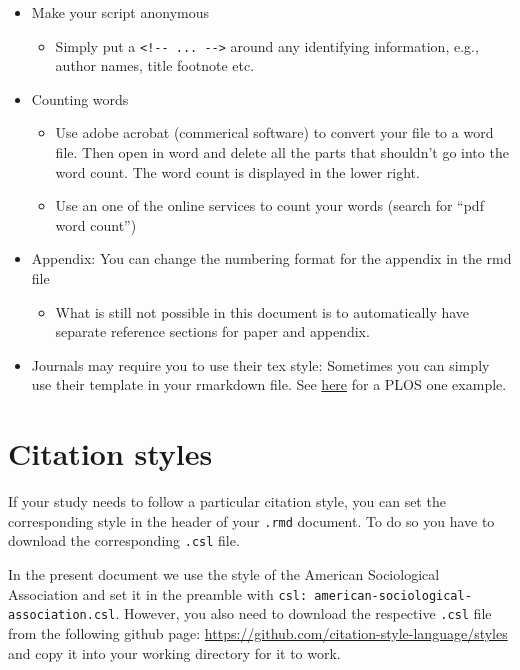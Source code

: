 \documentclass[
  12pt,
]{article}
\providecommand{\tightlist}{%
  \setlength{\itemsep}{0pt}\setlength{\parskip}{0pt}}
\begin{document}
\begin{itemize}
\tightlist
\item
  Make your script anonymous

  \begin{itemize}
  \tightlist
  \item
    Simply put a \texttt{\textless{}!-\/-\ ...\ -\/-\textgreater{}} around any identifying information, e.g., author names, title footnote etc.
  \end{itemize}
\item
  Counting words

  \begin{itemize}
  \tightlist
  \item
    Use adobe acrobat (commerical software) to convert your file to a word file. Then open in word and delete all the parts that shouldn't go into the word count. The word count is displayed in the lower right.
  \item
    Use an one of the online services to count your words (search for ``pdf word count'')
  \end{itemize}
\item
  Appendix: You can change the numbering format for the appendix in the rmd file

  \begin{itemize}
  \tightlist
  \item
    What is still not possible in this document is to automatically have separate reference sections for paper and appendix.
  \end{itemize}
\item
  Journals may require you to use their tex style: Sometimes you can simply use their template in your rmarkdown file. See \href{https://dataverse.harvard.edu/dataset.xhtml?persistentId=doi:10.7910/DVN/LDUMNY}{here} for a PLOS one example.
\end{itemize}

\hypertarget{citation-styles}{%
\section{Citation styles}\label{citation-styles}}

If your study needs to follow a particular citation style, you can set the corresponding style in the header of your \texttt{.rmd} document. To do so you have to download the corresponding \texttt{.csl} file.

In the present document we use the style of the American Sociological Association and set it in the preamble with \texttt{csl:\ american-sociological-association.csl}. However, you also need to download the respective \texttt{.csl} file from the following github page: \url{https://github.com/citation-style-language/styles} and copy it into your working directory for it to work.
\end{document}
